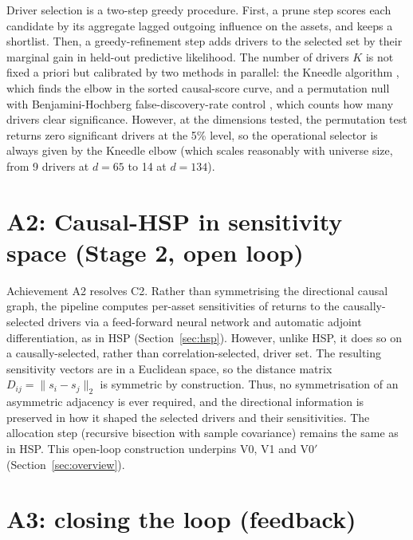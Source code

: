 \documentclass[12pt, a4paper]{report}
\begin{document}
Driver selection is a two-step greedy procedure. First, a prune step scores each candidate by its
aggregate lagged outgoing influence on the assets, and keeps a shortlist. 
Then, a greedy-refinement step adds drivers to the selected set by their marginal gain in held-out predictive likelihood. 
The number of drivers $K$ is
not fixed a priori but calibrated by two methods in parallel: the Kneedle
algorithm \cite{satopaa2011kneedle}, which finds the elbow in the sorted causal-score curve, and a
permutation null with Benjamini-Hochberg false-discovery-rate control \cite{benjamini1995fdr}, which counts
how many drivers clear significance. 
However, at the dimensions tested, the
permutation test returns zero significant drivers at the 5\% level, so the operational selector is
always given by the Kneedle elbow (which scales reasonably with universe size, from 9 drivers at $d=65$ to 14
at $d=134$).

\section{A2: Causal-HSP in sensitivity space (Stage 2, open loop)}
\label{sec:a2}

Achievement A2 resolves C2. Rather than symmetrising the directional causal graph, the pipeline
computes per-asset sensitivities of returns to the causally-selected drivers via a feed-forward
neural network and automatic adjoint differentiation, as in HSP (Section~\ref{sec:hsp}).
However, unlike HSP, it does so on a
causally-selected, rather than correlation-selected, driver set. The resulting sensitivity vectors are
in a Euclidean space, so the distance matrix $D_{ij} = \lVert s_i - s_j \rVert_2$ is symmetric by
construction. 
Thus, no symmetrisation of an asymmetric adjacency is ever required, and the directional
information is preserved in how it shaped the selected drivers and their sensitivities. 
The allocation step (recursive bisection with sample covariance) remains the same as in HSP.
This open-loop construction underpins V0, V1 and V0$'$ (Section~\ref{sec:overview}).

\section{A3: closing the loop (feedback)}
\label{sec:a3}
\end{document}
